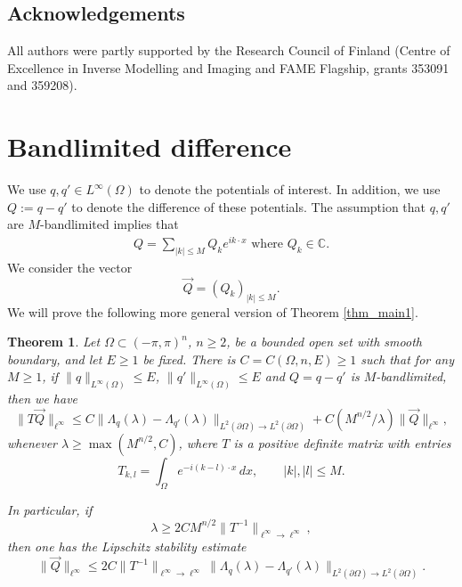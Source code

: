 \documentclass[a4paper, 11pt, twoside, notitlepage]{amsart}
\newtheorem{theorem}{Theorem}[section]
\theoremstyle{definition}
\theoremstyle{remark}
\newcommand{\norm}[1]{\lVert #1 \rVert}
\begin{document}
\subsection*{Acknowledgements}

All authors were partly supported by the Research Council of Finland (Centre of Excellence in Inverse Modelling and Imaging and FAME Flagship, grants 353091 and 359208).



\section{Bandlimited difference} \label{sec_bandlimited}

We use $q,q' \in L^{\infty}(\Omega)$ to denote the potentials of interest. In addition, we use $Q:=q-q'$ to denote the difference of these potentials. The assumption that $q,q'$ are $M$-bandlimited implies that 
\begin{align}\label{eq:bandlimited_def}
    Q=\sum_{|k|\leq M}Q_k e^{ik\cdot x} \text{ where } Q_k \in \mathbb{C}.
\end{align}
We consider the vector 
\[
\vec{Q} = (Q_k)_{|k| \leq M}.
\]
We will prove the following more general version of Theorem \ref{thm_main1}.

\begin{theorem} \label{thm_main1_omega}
    Let $\Omega\subset (-\pi,\pi)^n$, $n \geq 2$, be a bounded open set with smooth boundary, and let $E \geq 1$ be fixed. There is $C = C(\Omega, n, E) \geq 1$ such that for any $M \geq 1$, if $\norm{q}_{L^{\infty}(\Omega)} \leq E$, $\norm{q'}_{L^{\infty}(\Omega)} \leq E$ and $Q = q-q'$ is $M$-bandlimited, 
    then we have  
    \[ 
    \norm{T \vec{Q}}_{\ell^{\infty}}\leq C\|\Lambda_q(\lambda)-\Lambda_{q'}(\lambda)\|_{L^2(\partial \Omega)\rightarrow L^2(\partial \Omega)} + C(M^{n/2}/\lambda) \norm{\vec{Q}}_{\ell^{\infty}},
    \]
    whenever $\lambda \geq \max(M^{n/2}, C)$, where $T$ is a positive definite matrix with entries
    \[
    T_{k,l} = \int_{\Omega} e^{-i(k-l) \cdot x} \,dx, \qquad |k|, |l| \leq M.
    \]

    In particular, if 
    \[
    \lambda \geq 2 C M^{n/2} \norm{T^{-1}}_{\ell^{\infty} \to \ell^{\infty}},
    \]
    then one has the Lipschitz stability estimate 
    \[
    \norm{\vec{Q}}_{\ell^{\infty}} \leq 2 C \norm{T^{-1}}_{\ell^{\infty} \to \ell^{\infty}} \|\Lambda_q(\lambda)-\Lambda_{q'}(\lambda)\|_{L^2(\partial \Omega)\rightarrow L^2(\partial \Omega)}.
    \]
\end{theorem}
\end{document}
